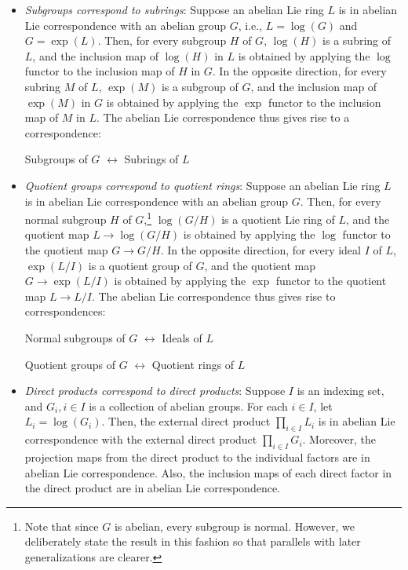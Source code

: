 \begin{itemize}
\item {\em Subgroups correspond to subrings}: Suppose an abelian Lie
  ring $L$ is in abelian Lie correspondence with an abelian group $G$,
  i.e., $L = \log(G)$ and $G = \exp(L)$. Then, for every subgroup $H$
  of $G$, $\log(H)$ is a subring of $L$, and the inclusion map of
  $\log(H)$ in $L$ is obtained by applying the $\log$ functor to the
  inclusion map of $H$ in $G$. In the opposite direction, for every
  subring $M$ of $L$, $\exp(M)$ is a subgroup of $G$, and the
  inclusion map of $\exp(M)$ in $G$ is obtained by applying the $\exp$
  functor to the inclusion map of $M$ in $L$. The abelian Lie
  correspondence thus gives rise to a correspondence:

  \begin{center}
    Subgroups of $G$ $\leftrightarrow$ Subrings of $L$
  \end{center}

\item {\em Quotient groups correspond to quotient rings}: Suppose an
  abelian Lie ring $L$ is in abelian Lie correspondence with an
  abelian group $G$. Then, for every normal subgroup $H$ of
  $G$,\footnote{Note that since $G$ is abelian, every subgroup is
    normal. However, we deliberately state the result in this fashion
    so that parallels with later generalizations are clearer.}
  $\log(G/H)$ is a quotient Lie ring of $L$, and the quotient map $L
  \to \log(G/H)$ is obtained by applying the $\log$ functor to the
  quotient map $G \to G/H$. In the opposite direction, for every ideal
  $I$ of $L$, $\exp(L/I)$ is a quotient group of $G$, and the quotient
  map $G \to \exp(L/I)$ is obtained by applying the $\exp$ functor to
  the quotient map $L \to L/I$. The abelian Lie correspondence thus
  gives rise to correspondences:

  \begin{center}
    Normal subgroups of $G$ $\leftrightarrow$ Ideals of $L$
  \end{center}
  
  \begin{center}
    Quotient groups of $G$ $\leftrightarrow$ Quotient rings of $L$
  \end{center}

\item {\em Direct products correspond to direct products}: Suppose $I$
  is an indexing set, and $G_i, i \in I$ is a collection of abelian
  groups. For each $i \in I$, let $L_i = \log(G_i)$. Then, the
  external direct product $\prod_{i \in I} L_i$ is in abelian Lie
  correspondence with the external direct product $\prod_{i \in I}
  G_i$. Moreover, the projection maps from the direct product to the
  individual factors are in abelian Lie correspondence. Also, the
  inclusion maps of each direct factor in the direct product are in
  abelian Lie correspondence.
\end{itemize}

